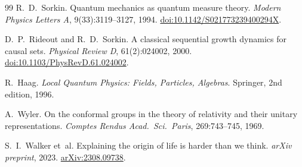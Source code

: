 \documentclass[11pt,a4paper]{article}
\begin{document}
\begin{thebibliography}{99}
R.~D.~Sorkin.
\newblock Quantum mechanics as quantum measure theory.
\newblock \emph{Modern Physics Letters A}, 9(33):3119--3127, 1994.
\newblock \href{https://doi.org/10.1142/S021773239400294X}%
  {doi:10.1142/S021773239400294X}.

D.~P.~Rideout and R.~D.~Sorkin.
\newblock A classical sequential growth dynamics for causal sets.
\newblock \emph{Physical Review D}, 61(2):024002, 2000.
\newblock \href{https://doi.org/10.1103/PhysRevD.61.024002}%
  {doi:10.1103/PhysRevD.61.024002}.

R.~Haag.
\newblock \emph{Local Quantum Physics: Fields, Particles, Algebras}.
\newblock Springer, 2nd edition, 1996.

A.~Wyler.
\newblock On the conformal groups in the theory of relativity and their
  unitary representations.
\newblock \emph{Comptes Rendus Acad.~Sci.~Paris}, 269:743--745, 1969.

S.~I.~Walker et~al.
\newblock Explaining the origin of life is harder than we think.
\newblock \emph{arXiv preprint}, 2023.
\newblock \href{https://arxiv.org/abs/2308.09738}{arXiv:2308.09738}.

\end{thebibliography}
\end{document}
